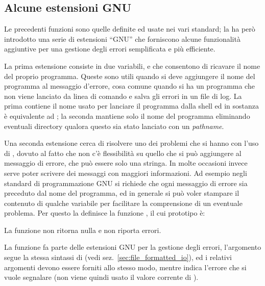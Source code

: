 \subsection{Alcune estensioni GNU}
\label{sec:sys_err_GNU}

Le precedenti funzioni sono quelle definite ed usate nei vari standard; la
 ha però introdotto una serie di estensioni ``GNU'' che
forniscono alcune funzionalità aggiuntive per una gestione degli errori
semplificata e più efficiente. 

La prima estensione consiste in due variabili,  e 
che consentono di ricavare il nome del proprio programma.  Queste sono utili
quando si deve aggiungere il nome del programma al messaggio d'errore, cosa
comune quando si ha un programma che non viene lanciato da linea di comando e
salva gli errori in un file di log. La prima contiene il nome usato per
lanciare il programma dalla shell ed in sostanza è equivalente ad
; la seconda mantiene solo il nome del programma eliminando
eventuali directory qualora questo sia stato lanciato con un
\textit{pathname}.

Una seconda estensione cerca di risolvere uno dei problemi che si hanno con
l'uso di , dovuto al fatto che non c'è flessibilità su quello che
si può aggiungere al messaggio di errore, che può essere solo una stringa. In
molte occasioni invece serve poter scrivere dei messaggi con maggiori
informazioni. Ad esempio negli standard di programmazione GNU si richiede che
ogni messaggio di errore sia preceduto dal nome del programma, ed in generale
si può voler stampare il contenuto di qualche variabile per facilitare la
comprensione di un eventuale problema. Per questo la  definisce
la funzione , il cui prototipo è:

\begin{funcproto}{
}

{La funzione non ritorna nulla e non riporta errori.}  
\end{funcproto}

La funzione fa parte delle estensioni GNU per la gestione degli errori,
l'argomento  segue la stessa sintassi di  (vedi
sez.~\ref{sec:file_formatted_io}), ed i relativi argomenti devono essere
forniti allo stesso modo, mentre  indica l'errore che si vuole
segnalare (non viene quindi usato il valore corrente di ).

